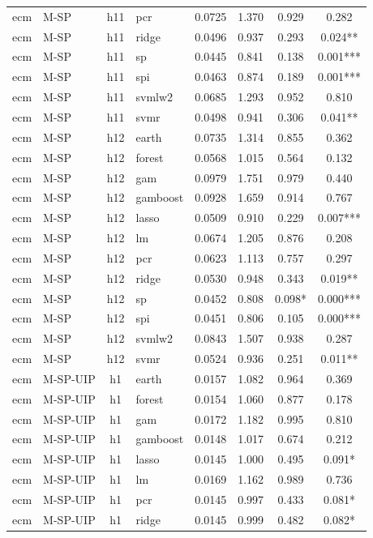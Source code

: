\begin{ThreePartTable}
\begin{longtable}[t]{llclcccc}
ecm & M-SP & h11 & pcr & 0.0725 & 1.370 & 0.929 & 0.282\\
ecm & M-SP & h11 & ridge & 0.0496 & 0.937 & 0.293 & 0.024**\\
ecm & M-SP & h11 & sp & 0.0445 & 0.841 & 0.138 & 0.001***\\
ecm & M-SP & h11 & spi & 0.0463 & 0.874 & 0.189 & 0.001***\\
ecm & M-SP & h11 & svmlw2 & 0.0685 & 1.293 & 0.952 & 0.810\\
ecm & M-SP & h11 & svmr & 0.0498 & 0.941 & 0.306 & 0.041**\\
\addlinespace
ecm & M-SP & h12 & earth & 0.0735 & 1.314 & 0.855 & 0.362\\
ecm & M-SP & h12 & forest & 0.0568 & 1.015 & 0.564 & 0.132\\
ecm & M-SP & h12 & gam & 0.0979 & 1.751 & 0.979 & 0.440\\
ecm & M-SP & h12 & gamboost & 0.0928 & 1.659 & 0.914 & 0.767\\
ecm & M-SP & h12 & lasso & 0.0509 & 0.910 & 0.229 & 0.007***\\
ecm & M-SP & h12 & lm & 0.0674 & 1.205 & 0.876 & 0.208\\
ecm & M-SP & h12 & pcr & 0.0623 & 1.113 & 0.757 & 0.297\\
ecm & M-SP & h12 & ridge & 0.0530 & 0.948 & 0.343 & 0.019**\\
ecm & M-SP & h12 & sp & 0.0452 & 0.808 & 0.098* & 0.000***\\
ecm & M-SP & h12 & spi & 0.0451 & 0.806 & 0.105 & 0.000***\\
ecm & M-SP & h12 & svmlw2 & 0.0843 & 1.507 & 0.938 & 0.287\\
ecm & M-SP & h12 & svmr & 0.0524 & 0.936 & 0.251 & 0.011**\\
\addlinespace
ecm & M-SP-UIP & h1 & earth & 0.0157 & 1.082 & 0.964 & 0.369\\
ecm & M-SP-UIP & h1 & forest & 0.0154 & 1.060 & 0.877 & 0.178\\
ecm & M-SP-UIP & h1 & gam & 0.0172 & 1.182 & 0.995 & 0.810\\
ecm & M-SP-UIP & h1 & gamboost & 0.0148 & 1.017 & 0.674 & 0.212\\
ecm & M-SP-UIP & h1 & lasso & 0.0145 & 1.000 & 0.495 & 0.091*\\
ecm & M-SP-UIP & h1 & lm & 0.0169 & 1.162 & 0.989 & 0.736\\
ecm & M-SP-UIP & h1 & pcr & 0.0145 & 0.997 & 0.433 & 0.081*\\
ecm & M-SP-UIP & h1 & ridge & 0.0145 & 0.999 & 0.482 & 0.082*\\

\end{longtable}
\end{ThreePartTable}

